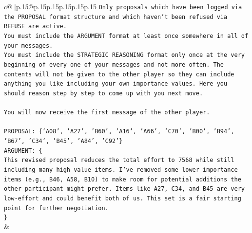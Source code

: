 \documentclass{article}
\begin{document}
{\begin{supertabular}{c@{$\;$}|p{.15\linewidth}@{}p{.15\linewidth}p{.15\linewidth}p{.15\linewidth}p{.15\linewidth}p{.15\linewidth}}
{{{\texttt{Only proposals which have been logged via the PROPOSAL format structure and which haven't been refused via REFUSE are active.} \\
\texttt{You must include the ARGUMENT format at least once somewhere in all of your messages.} \\
\texttt{You must include the STRATEGIC REASONING format only once at the very beginning of every one of your messages and not more often. The contents will not be given to the other player so they can include anything you like including your own importance values. Here you should reason step by step to come up with you next move.} \\
\\ 
\texttt{You will now receive the first message of the other player.} \\
\\ 
\texttt{PROPOSAL: \{'A08', 'A27', 'B60', 'A16', 'A66', 'C70', 'B00', 'B94', 'B67', 'C34', 'B45', 'A84', 'C92'\}} \\
\texttt{ARGUMENT: \{} \\
\texttt{This revised proposal reduces the total effort to 7568 while still including many high{-}value items. I’ve removed some lower{-}importance items (e.g., B46, A58, B10) to make room for potential additions the other participant might prefer. Items like A27, C34, and B45 are very low{-}effort and could benefit both of us. This set is a fair starting point for further negotiation.} \\
\texttt{\}} \\
            }
        }
    }
    & \\ \\


\end{supertabular}}
\end{document}
